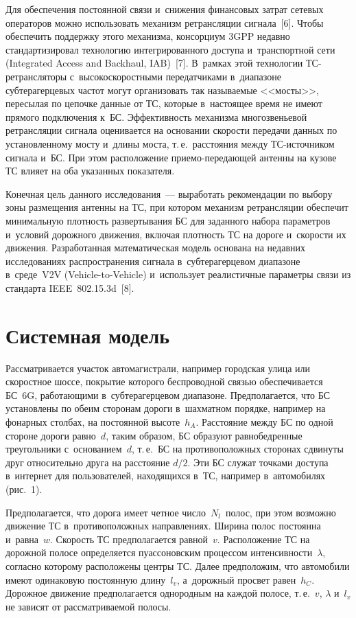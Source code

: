 \begin{multicols}{2}
     
     Для обеспечения постоянной связи и~снижения финансовых затрат 
сетевых операторов можно использовать механизм ретрансляции 
сигнала~[6]. Чтобы обеспечить поддержку этого механизма, консорциум 
3GPP недавно стандартизировал технологию интегрированного доступа 
и~транспортной сети (Integrated Access and Backhaul, IAB)~[7]. В~рамках 
этой технологии ТС-ретрансляторы с~высокоскоростными передатчиками 
в~диапазоне субтерагерцевых частот могут организовать так называемые 
<<мосты>>, пересылая по цепочке данные от ТС, которые в~настоящее время 
не имеют прямого подключения к~БС. Эффективность механизма 
многозвеньевой ретрансляции сигнала оценивается на основании ско\-рости 
передачи данных по установленному мосту и~длины моста, т.\,е.\ расстояния 
между ТС-источником сигнала и~БС. При этом расположение  
при\-емо-пе\-ре\-да\-ющей антенны на кузове ТС влияет на оба указанных 
показателя. 
     
     Конечная цель данного исследования~--- выработать рекомендации по 
выбору зоны размещения антенны на ТС, при котором механизм 
ретрансляции обеспечит минимальную плотность развертывания БС для 
заданного набора параметров и~условий дорожного движения, включая 
плотность ТС на дороге и~ско\-рости их движения. Разработанная 
математическая модель основана на недавних исследованиях 
распространения сигнала в~субтерагерцевом диапазоне в~среде~V2V 
(Vehicle-to-Vehicle) и~использует реалистичные параметры связи из стандарта 
IEEE~802.15.3d~[8].
     
\section{Системная модель}

     Рассматривается участок автомагистрали, например городская улица 
или скоростное шоссе, покрытие которого беспроводной связью 
обеспечивается БС~6G, работающими в~субтерагерцевом 
диапазоне. Предполагается, что БС установлены по обеим сторонам дороги 
в~шахматном порядке, например на фонарных столбах, на постоянной 
высоте~$h_A$. Расстояние между БС по одной стороне дороги равно~$d$, 
таким образом, БС образуют равнобедренные треугольники 
с~основанием~$d$, т.\,е.\ БС на противоположных сторонах сдвинуты друг 
относительно друга на расстояние $d/2$. Эти БС служат точками доступа 
в~интернет для пользователей, находящихся в~ТС, например в~автомобилях 
(рис.~1).
     


     Предполагается, что дорога имеет четное чис\-ло~$N_l$~полос, при этом 
возможно движение ТС в~противоположных направлениях. Ширина полос 
постоянна и~равна~$w$. Ско\-рость ТС предполагается равной~$v$. 
Расположение ТС на дорожной полосе определяется пуассоновским 
процессом ин\-тен\-сив\-ности~$\lambda$, согласно которому расположены 
центры ТС. Далее предположим, что автомобили имеют 
одинаковую постоянную длину~$l_v$, а~дорожный просвет равен~$h_C$. 
Дорожное движение предполагается однородным на каждой полосе, т.\,е.\
     $v$, $\lambda$ и~$l_v$ не зависят от рассматриваемой полосы. 
     

\end{multicols}
